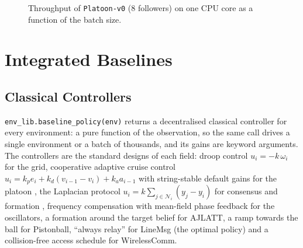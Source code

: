 \documentclass{article}
\newcommand{\code}[1]{\texttt{#1}}
\newcommand{\envid}[1]{\texttt{#1}}
\begin{document}
\begin{figure}[t]
  \centering
  \caption{Throughput of \envid{Platoon-v0} (8 followers) on one CPU core as
    a function of the batch size.}
  \label{fig:throughput}
\end{figure}

\section{Integrated Baselines}\label{sec:baselines}

\subsection{Classical Controllers}\label{sec:classical}

\code{env\_lib.baseline\_policy(env)} returns a decentralised classical
controller for every environment: a pure function of the observation, so the
same call drives a single environment or a batch of thousands, and its gains
are keyword arguments. The controllers are the standard designs of each field:
droop control $u_i = -k\,\omega_i$ for the grid, cooperative adaptive cruise
control $u_i = k_p e_i + k_d (v_{i-1}-v_i) + k_a a_{i-1}$ with string-stable
default gains for the platoon \citep{ploeg2011cacc}, the Laplacian protocol
$u_i = k\sum_{j\in\mathcal{N}_i}(y_j-y_i)$ for consensus and formation
\citep{olfati2004consensus}, frequency compensation with mean-field phase
feedback for the oscillators, a formation around the target belief for
AJLATT, a ramp towards the ball for Pistonball, ``always relay'' for LineMsg
(the optimal policy) and a collision-free access schedule for WirelessComm.
\end{document}
